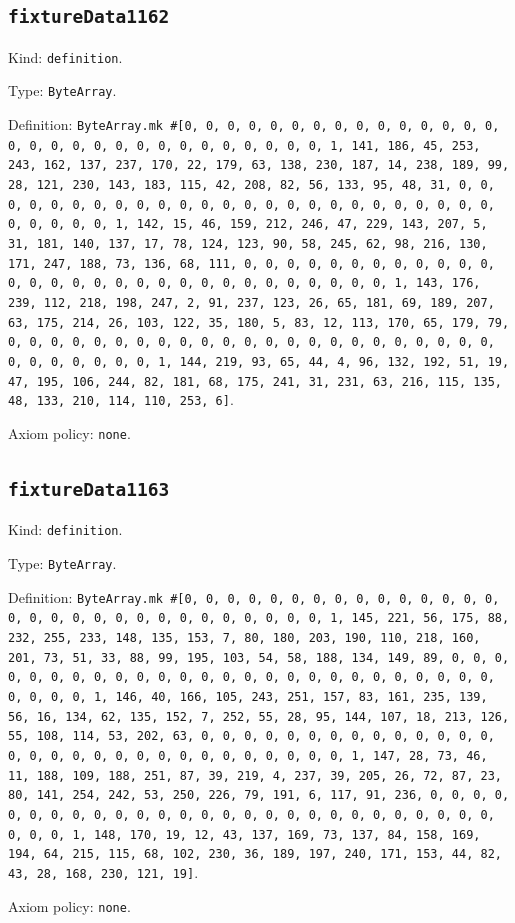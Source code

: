 \documentclass[11pt]{article}
\begin{document}
\subsection*{\texttt{fixtureData1162}}
\noindent Kind: \texttt{definition}.\par
\noindent Type: \texttt{ByteArray}.\par
\noindent Definition: \texttt{ByteArray.mk \#[0, 0, 0, 0, 0, 0, 0, 0, 0, 0, 0, 0, 0, 0, 0, 0, 0, 0, 0, 0, 0, 0, 0, 0, 0, 0, 0, 0, 0, 0, 1, 141, 186, 45, 253, 243, 162, 137, 237, 170, 22, 179, 63, 138, 230, 187, 14, 238, 189, 99, 28, 121, 230, 143, 183, 115, 42, 208, 82, 56, 133, 95, 48, 31, 0, 0, 0, 0, 0, 0, 0, 0, 0, 0, 0, 0, 0, 0, 0, 0, 0, 0, 0, 0, 0, 0, 0, 0, 0, 0, 0, 0, 0, 0, 1, 142, 15, 46, 159, 212, 246, 47, 229, 143, 207, 5, 31, 181, 140, 137, 17, 78, 124, 123, 90, 58, 245, 62, 98, 216, 130, 171, 247, 188, 73, 136, 68, 111, 0, 0, 0, 0, 0, 0, 0, 0, 0, 0, 0, 0, 0, 0, 0, 0, 0, 0, 0, 0, 0, 0, 0, 0, 0, 0, 0, 0, 0, 0, 1, 143, 176, 239, 112, 218, 198, 247, 2, 91, 237, 123, 26, 65, 181, 69, 189, 207, 63, 175, 214, 26, 103, 122, 35, 180, 5, 83, 12, 113, 170, 65, 179, 79, 0, 0, 0, 0, 0, 0, 0, 0, 0, 0, 0, 0, 0, 0, 0, 0, 0, 0, 0, 0, 0, 0, 0, 0, 0, 0, 0, 0, 0, 0, 1, 144, 219, 93, 65, 44, 4, 96, 132, 192, 51, 19, 47, 195, 106, 244, 82, 181, 68, 175, 241, 31, 231, 63, 216, 115, 135, 48, 133, 210, 114, 110, 253, 6]}.\par
\noindent Axiom policy: \texttt{none}.\par
\subsection*{\texttt{fixtureData1163}}
\noindent Kind: \texttt{definition}.\par
\noindent Type: \texttt{ByteArray}.\par
\noindent Definition: \texttt{ByteArray.mk \#[0, 0, 0, 0, 0, 0, 0, 0, 0, 0, 0, 0, 0, 0, 0, 0, 0, 0, 0, 0, 0, 0, 0, 0, 0, 0, 0, 0, 0, 0, 1, 145, 221, 56, 175, 88, 232, 255, 233, 148, 135, 153, 7, 80, 180, 203, 190, 110, 218, 160, 201, 73, 51, 33, 88, 99, 195, 103, 54, 58, 188, 134, 149, 89, 0, 0, 0, 0, 0, 0, 0, 0, 0, 0, 0, 0, 0, 0, 0, 0, 0, 0, 0, 0, 0, 0, 0, 0, 0, 0, 0, 0, 0, 0, 1, 146, 40, 166, 105, 243, 251, 157, 83, 161, 235, 139, 56, 16, 134, 62, 135, 152, 7, 252, 55, 28, 95, 144, 107, 18, 213, 126, 55, 108, 114, 53, 202, 63, 0, 0, 0, 0, 0, 0, 0, 0, 0, 0, 0, 0, 0, 0, 0, 0, 0, 0, 0, 0, 0, 0, 0, 0, 0, 0, 0, 0, 0, 0, 1, 147, 28, 73, 46, 11, 188, 109, 188, 251, 87, 39, 219, 4, 237, 39, 205, 26, 72, 87, 23, 80, 141, 254, 242, 53, 250, 226, 79, 191, 6, 117, 91, 236, 0, 0, 0, 0, 0, 0, 0, 0, 0, 0, 0, 0, 0, 0, 0, 0, 0, 0, 0, 0, 0, 0, 0, 0, 0, 0, 0, 0, 0, 0, 1, 148, 170, 19, 12, 43, 137, 169, 73, 137, 84, 158, 169, 194, 64, 215, 115, 68, 102, 230, 36, 189, 197, 240, 171, 153, 44, 82, 43, 28, 168, 230, 121, 19]}.\par
\noindent Axiom policy: \texttt{none}.\par
\end{document}

